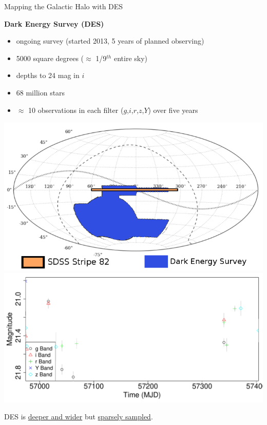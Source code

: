 \documentclass[12pt]{beamer}
\begin{document}
\begin{frame}{Mapping the Galactic Halo with DES}

\textbf{Dark Energy Survey (DES)}
\begin{itemize}
\item ongoing survey (started 2013, 5 years of planned observing)
\item 5000 square degrees ($\approx$ 1/9$^{th}$ entire sky)
\item depths to 24 mag in $i$
\item 68 million stars
\item $\approx$ 10 observations in each filter ($g$,$i$,$r$,$z$,$Y$) over five years
\end{itemize}

\vspace{.1in}
\includegraphics[scale=0.2]{figs/des_observing_strategy.png}
\includegraphics[scale=0.2]{figs/unfolded_des_2.pdf}

\vspace{.1in}

\begin{center}
  DES is \underline{deeper and wider} but \underline{sparsely sampled}.
\end{center}

\end{frame}
\end{document}
